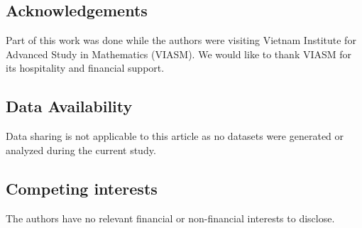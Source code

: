 \documentclass[12pt]{amsart}
\numberwithin{equation}{section}
\theoremstyle{definition}
\theoremstyle{definition}
\begin{document}
\subsection*{Acknowledgements}

Part of this work was done while the authors were visiting Vietnam Institute for Advanced Study in Mathematics (VIASM).  We would like to thank VIASM for its hospitality and financial support.


\subsection*{Data Availability} Data sharing is not applicable to this article as no datasets were generated or analyzed during the current study.


\subsection*{Competing interests} The authors have no relevant financial or non-financial interests to disclose.



	
\end{document}
